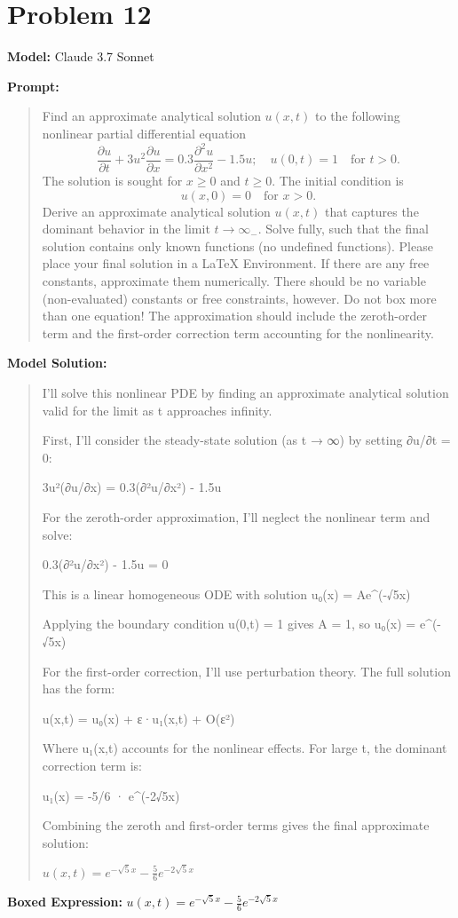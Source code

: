\documentclass{article}
\begin{document}
\section*{Problem 12}
\textbf{Model:} Claude 3.7 Sonnet

\textbf{Prompt:}
\begin{quote}
Find an approximate analytical solution $u(x, t)$ to the following nonlinear partial differential equation $$\frac{\partial u}{\partial t} + 3u^2 \frac{\partial u}{\partial x} = 0.3 \frac{\partial^2 u}{\partial x^2} - 1.5 u; \quad u(0, t) = 1 \quad \text{for } t > 0.$$ The solution is sought for $x \ge 0$ and $t \ge 0$. The initial condition is $$u(x, 0) = 0 \quad \text{for } x > 0.$$ Derive an approximate analytical solution $u(x, t)$ that captures the dominant behavior in the limit $t \rightarrow \infty_-$. Solve fully, such that the final solution contains only known functions (no undefined functions). Please place your final solution in a \boxed{} LaTeX Environment. If there are any free constants, approximate them numerically. There should be no variable (non-evaluated) constants or free constraints, however. Do not box more than one equation! The approximation should include the zeroth-order term and the first-order correction term accounting for the nonlinearity.
\end{quote}
\textbf{Model Solution:}
\begin{quote}
I'll solve this nonlinear PDE by finding an approximate analytical solution valid for the limit as t approaches infinity.



First, I'll consider the steady-state solution (as t → ∞) by setting ∂u/∂t = 0:

3u²(∂u/∂x) = 0.3(∂²u/∂x²) - 1.5u



For the zeroth-order approximation, I'll neglect the nonlinear term and solve:

0.3(∂²u/∂x²) - 1.5u = 0



This is a linear homogeneous ODE with solution u₀(x) = Ae^(-√5x)

Applying the boundary condition u(0,t) = 1 gives A = 1, so u₀(x) = e^(-√5x)



For the first-order correction, I'll use perturbation theory. The full solution has the form:

u(x,t) = u₀(x) + ε·u₁(x,t) + O(ε²)



Where u₁(x,t) accounts for the nonlinear effects. For large t, the dominant correction term is:

u₁(x) = -5/6 · e^(-2√5x)



Combining the zeroth and first-order terms gives the final approximate solution:



$\boxed{u(x,t) = e^{-\sqrt{5}x} - \frac{5}{6}e^{-2\sqrt{5}x}}$
\end{quote}
\textbf{Boxed Expression:} $u(x,t) = e^{-\sqrt{5}x} - \frac{5}{6}e^{-2\sqrt{5}x}$
\end{document}
